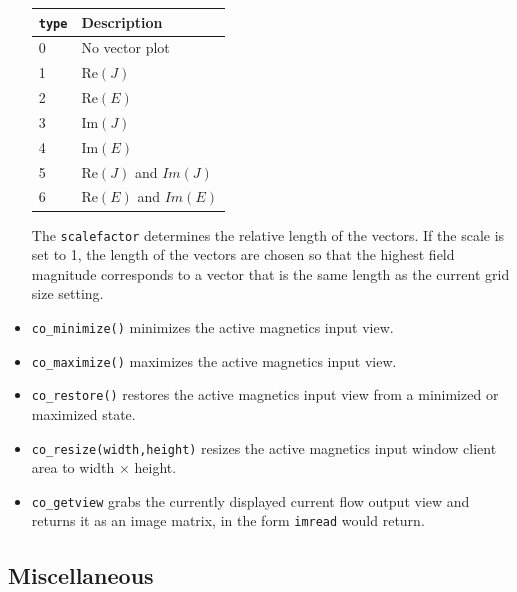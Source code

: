 \begin{itemize}
\begin{tabular}{ll}
\texttt{type} &  Description  \\ \hline
0 & No vector plot \\
1 & $\mbox{Re}(J)$ \\
2 & $\mbox{Re}(E)$ \\
3 & $\mbox{Im}(J)$ \\
4 & $\mbox{Im}(E)$ \\
5 & $\mbox{Re}(J)$ and $Im(J)$ \\
6 & $\mbox{Re}(E)$ and $Im(E)$
\end{tabular}
The \texttt{scalefactor}
determines the relative length of the vectors. If the scale is set
to 1, the length of the vectors are chosen so that the highest field
magnitude corresponds to a vector that is the same length as the
current grid size setting.

\item{\tt co\_minimize()} minimizes the active magnetics input view.

\item{\tt co\_maximize()} maximizes the active magnetics input view.

\item{\tt co\_restore()} restores the active magnetics input view from a
 minimized or maximized state.

\item{\tt co\_resize(width,height)} resizes the active magnetics input
 window client area to width $\times$ height.
\item{\tt co\_getview} grabs the currently displayed current flow output view and
 returns it as an image matrix, in the form \texttt{imread} would return.

\end{itemize}

\subsection{Miscellaneous}

